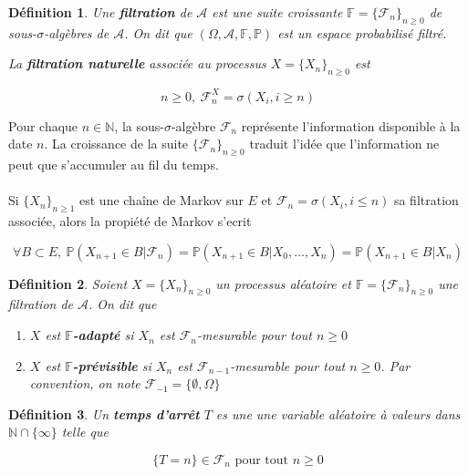 \documentclass[10pt,a4paper,oneside]{article}
\newtheorem{definition}{Définition}
\begin{document}
\begin{definition}
Une \textbf{filtration} de $\mathcal{A}$ est une suite croissante $\mathbb{F} = \{ \mathcal{F}_n \}_{n \geq 0}$ de sous-$\sigma$-algèbres de $\mathcal{A}$. On dit que $(\Omega, \mathcal{A}, \mathbb{F}, \mathbb{P})$ est un espace probabilisé filtré.

La \textbf{filtration naturelle} associée au processus $X = \{ X_n \}_{n \geq 0}$ est

\[ n \geq 0,\ \mathcal{F}_n^X = \sigma(X_i,i \geq n) \]
\end{definition}

Pour chaque $n \in \mathbb{N}$, la sous-$\sigma$-algèbre $\mathcal{F}_n$ représente l'information disponible à la date $n$. La croissance de la suite $\{ \mathcal{F}_n \}_{n \geq 0}$ traduit l'idée que l'information ne peut que s'accumuler au fil du temps.
\\ \\
Si $\{ X_n \}_{n \geq 1}$ est une chaîne de Markov sur $E$ et $\mathcal{F}_n = \sigma(X_i,i \leq n)$ sa filtration associée, alors la propiété de Markov s'ecrit

\[ \forall B \subset E,\ \mathbb{P}(X_{n + 1} \in B | \mathcal{F}_n) = \mathbb{P}(X_{n + 1} \in B | X_0,\ldots,X_n) = \mathbb{P}(X_{n + 1} \in B | X_n) \]

\begin{definition}
Soient $X = \{ X_n \}_{n \geq 0}$ un processus aléatoire et $\mathbb{F} = \{ \mathcal{F}_n \}_{n \geq 0}$ une filtration de $\mathcal{A}$. On dit que

\begin{enumerate}
\item
$X$ est \textbf{$\mathbb{F}$-adapté} si $X_n$ est $\mathcal{F}_n$-mesurable pour tout $n \geq 0$

\item
$X$ est \textbf{$\mathbb{F}$-prévisible} si $X_n$ est $\mathcal{F}_{n - 1}$-mesurable pour tout $n \geq 0$. Par convention, on note $\mathcal{F}_{-1} = \{ \emptyset, \Omega \}$
\end{enumerate}
\end{definition}

\begin{definition}
Un \textbf{temps d'arrêt} $T$ es une une variable aléatoire à valeurs dans $\mathbb{N} \cap \{ \infty \}$ telle que

\[ \{ T = n \} \in \mathcal{F}_n \text{ pour tout } n \geq 0 \]
\end{definition}
\end{document}
